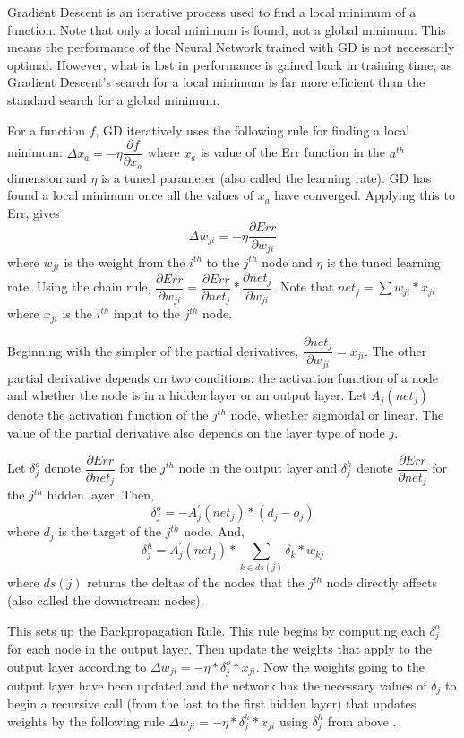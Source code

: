 \documentclass[twoside,11pt]{article}
\newcommand{\jth}{$j^{th}$ }
\begin{document}
Gradient Descent is an iterative process used to find a local minimum of a function. Note that only a local minimum is found, not a global minimum.
This means the performance of the Neural Network trained with GD is not necessarily optimal.
However, what is lost in performance is gained back in training time, as Gradient Descent's search for a local minimum is far more efficient than the standard search for a global minimum.

For a function $f$, GD iteratively uses the following rule for finding a local minimum:
$\Delta x_a = - \eta \dfrac{\partial f}{\partial x_a}$ where $x_a$ is value of the Err function in the $a^{th}$ dimension and $\eta$ is a tuned parameter (also called the learning rate). GD has found a local minimum once all the values of $x_a$ have converged.
Applying this to Err, gives
$$\Delta w_{ji} = - \eta \dfrac{\partial Err}{\partial w_{ji}}$$
where $w_{ji}$ is the weight from the $i^{th}$ to the $j^{th}$ node and $\eta$ is the tuned learning rate. Using the chain rule,
$\dfrac{\partial Err}{\partial w_{ji}} = \dfrac{\partial Err}{\partial net_{j}} * \dfrac{\partial net_j}{\partial w_{ji}}$. Note that $net_j = \sum w_{ji} * x_{ji}$ where $x_{ji}$ is the $i^{th}$ input to the $j^{th}$ node.

Beginning with the simpler of the partial derivatives, $\dfrac{\partial net_j}{\partial w_{ji}} = x_{ji}$.
The other partial derivative depends on two conditions: the activation function of a node and whether the node is in a hidden layer or an output layer. Let $A_j(net_j)$ denote the activation function of the \jth node, whether sigmoidal or linear. 
The value of the partial derivative also depends on the layer type of node $j$. 

Let $\delta _j^o$ denote $\dfrac{\partial Err}{\partial net_{j}}$ for the \jth node in the output layer and $\delta ^h_j$ denote $\dfrac{\partial Err}{\partial net_{j}}$ for the \jth hidden layer. 
Then, 
$$\delta _j^o = -A^\prime _j (net_j) * (d_j - o_j)$$
where $d_j$ is the target of the \jth node. And, 
$$\delta ^h_j = A^\prime _j (net_j) * \sum_{k \in ds(j)} \delta _k * w_{kj}$$ 
where $ds(j)$ returns the deltas of the nodes that the \jth node directly affects (also called the downstream nodes).

This sets up the Backpropagation Rule. This rule begins by computing each $\delta _j^o$ for each node in the output layer. Then update the weights that apply to the output layer according to 
$\Delta w_{ji} = - \eta * \delta _j^o * x_{ji}$.
Now the weights going to the output layer have been updated and the network has the necessary values of $\delta _j$ to begin a recursive call (from the last to the first hidden layer) that updates weights by the following rule
$\Delta w_{ji} = - \eta * \delta _j^h * x_{ji}$ using $\delta _j^h$ 
from above \citep{rumelhart1988learning}.
\end{document}
